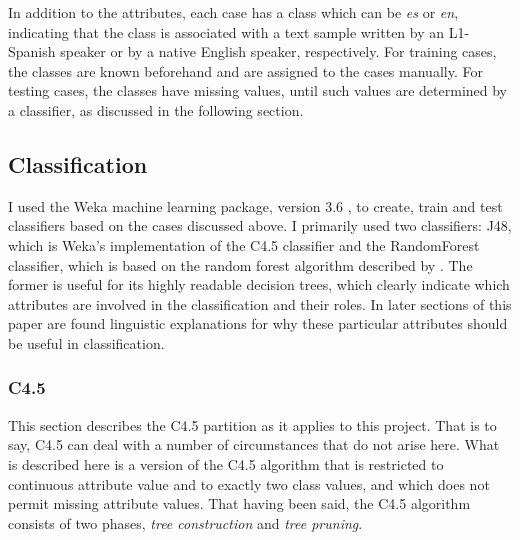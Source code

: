 \documentclass[main.tex]{subfiles}
\begin{document}
In addition to the attributes, each case has a class which can be \textit{es} or \textit{en}, indicating that the class is associated with a text sample written by an L1-Spanish speaker or by a native English speaker, respectively. For training cases, the classes are known beforehand and are assigned to the cases manually. For testing cases, the classes have missing values, until such values are determined by a classifier, as discussed in the following section.

\subsection{Classification}

I used the Weka machine learning package, version 3.6 \citep{hall-et-al:2009}, to create, train and test classifiers based on the cases discussed above. I primarily used two classifiers: J48, which is Weka's implementation of the C4.5 classifier \citep*{quinlan:1993} and the RandomForest classifier, which is based on the random forest algorithm described by \citet{breiman:2001}. The former is useful for its highly readable decision trees, which clearly indicate which attributes are involved in the classification and their roles. In later sections of this paper are found linguistic explanations for why these particular attributes should be useful in classification.
 
\subsubsection{C4.5}

This section describes the C4.5 partition as it applies to this project. That is to say, C4.5 can deal with a number of circumstances that do not arise here. What is described here is a version of the C4.5 algorithm that is restricted to continuous attribute value and to exactly two class values, and which does not permit missing attribute values. That having been said, the C4.5 algorithm consists of two phases, \textit{tree construction} and \textit{tree pruning}.
\end{document}
